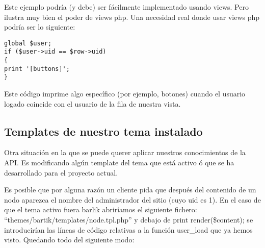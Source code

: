 \documentclass[11pt]{article}
\begin{document}
Este ejemplo podría (y debe) ser fácilmente implementado usando
views. Pero ilustra muy bien el poder de views php. Una necesidad real
donde usar views php podría ser lo siguiente:


\begin{verbatim}
global $user;
if ($user->uid == $row->uid)
{
print '[buttons]';
}
\end{verbatim}



Este código imprime algo específico (por ejemplo, botones) cuando el
usuario logado coincide con el usuario de la fila de nuestra vista.

\subsection{Templates de nuestro tema instalado}
\label{sec-1.6}


Otra situación en la que se puede querer aplicar nuestros
conocimientos de la API. Es modificando algún template del tema que
está activo ó que se ha desarrollado para el proyecto actual.

Es posible que por alguna razón un cliente pida que después del
contenido de un nodo aparezca el nombre del administrador del sitio
(cuyo uid es 1). En el caso de que el tema activo fuera barlik
abriríamos el siguiente fichero:
``themes/bartik/templates/node.tpl.php'' y debajo de print
render(\$content); se introducirían las líneas de código relativas a la
función user\_load que ya hemos visto. Quedando todo del siguiente
modo:
\end{document}
